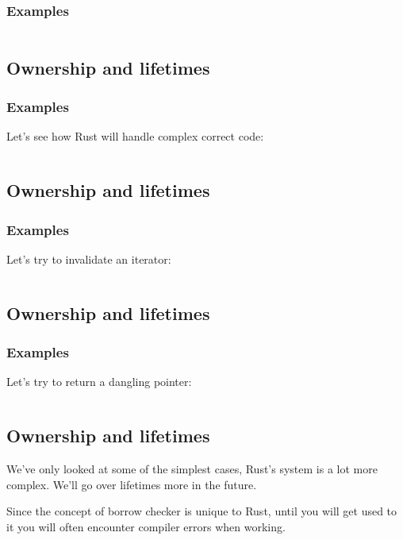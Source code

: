 \documentclass[usenames,twocolumn,dvipsnames,10pt,a4wide]{article}
\begin{document}
	\subsubsection{Examples}
	\inputminted[fontsize=\normalsize]{rust}{code/own6.rs}


\subsection{Ownership and lifetimes}
	\subsubsection{Examples}
	Let's see how Rust will handle complex correct code:
	
	\inputminted[fontsize=\normalsize]{rust}{code/own7.rs}
	


\subsection{Ownership and lifetimes}
	\subsubsection{Examples}
	Let's try to invalidate an iterator:
	
	\inputminted[fontsize=\normalsize]{rust}{code/own8.rs}
	


\subsection{Ownership and lifetimes}
	\subsubsection{Examples}
	Let's try to return a dangling pointer:
	
	\inputminted[fontsize=\normalsize]{rust}{code/own9.rs}
	


\subsection{Ownership and lifetimes}
We've only looked at some of the simplest cases,
Rust's system is a lot more complex. We'll go
over lifetimes more in the future.

Since the concept of borrow checker is unique to
Rust, until you will get used to it you will often
encounter compiler errors when working.
\end{document}
